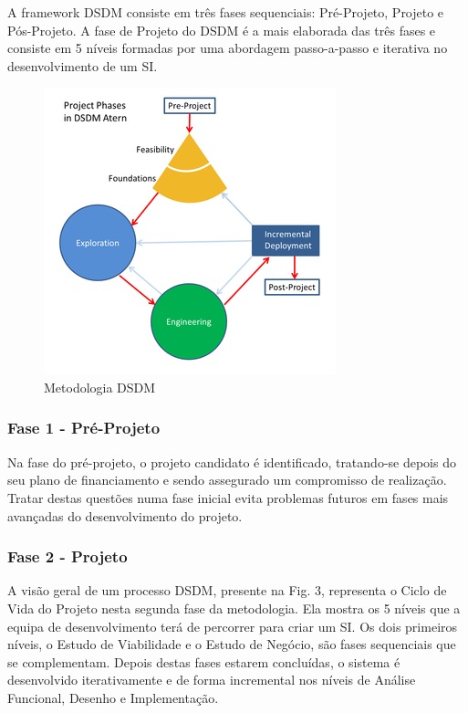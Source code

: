 A framework DSDM consiste em três fases sequenciais: Pré-Projeto, Projeto e Pós-Projeto. A fase de Projeto do DSDM é a mais elaborada das três fases e consiste em 5 níveis formadas por uma abordagem passo-a-passo e iterativa no desenvolvimento de um SI.

\begin{figure}[H]
    \centering
    \includegraphics[scale=1]{Imagens/dsdm.png}
    \caption{Metodologia DSDM}
    \label{fig:dsdm}
\end{figure}

\subsubsection{Fase 1 - Pré-Projeto}

Na fase do pré-projeto, o projeto candidato é identificado, tratando-se depois do seu plano de financiamento e sendo assegurado um compromisso de realização. Tratar destas questões numa fase inicial evita problemas futuros em fases mais avançadas do desenvolvimento do projeto.

\subsubsection{Fase 2 - Projeto}

A visão geral de um processo DSDM, presente na Fig. 3, representa o Ciclo de Vida do Projeto nesta segunda fase da metodologia. Ela mostra os 5 níveis que a equipa de desenvolvimento terá de percorrer para criar um SI. Os dois primeiros níveis, o Estudo de Viabilidade e o Estudo de Negócio, são fases sequenciais que se complementam. Depois destas fases estarem concluídas, o sistema é desenvolvido iterativamente e de forma incremental nos níveis de Análise Funcional, Desenho e Implementação.

